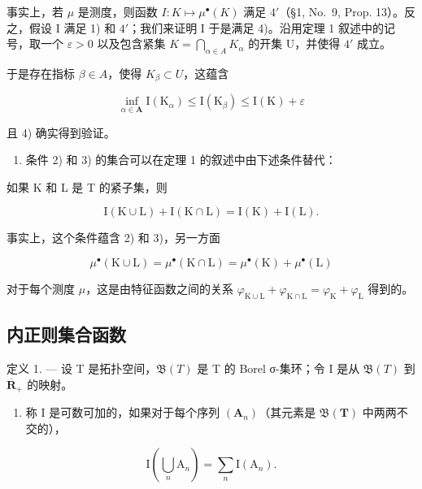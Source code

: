 事实上，若 \(\mu\) 是测度，则函数 \(I: K \mapsto \mu^{\bullet}(K)\) 满足 \(4'\)（§1, No.~9, Prop. 13）。反之，假设 I 满足 1) 和 \(4'\)；我们来证明 I 于是满足 4)。沿用定理 1 叙述中的记号，取一个 \(\varepsilon > 0\) 以及包含紧集 \(K = \bigcap_{\alpha \in A} K_{\alpha}\) 的开集 U，并使得 \(4'\) 成立。

于是存在指标 \(\beta \in A\)，使得 \(K_{\beta} \subset U\)，这蕴含

\[
\inf _ {\alpha \in \mathbf {A}} \mathrm{I} (\mathrm{K} _ {\alpha}) \leqslant \mathrm{I} (\mathrm{K} _ {\beta}) \leqslant \mathrm{I} (\mathrm{K}) + \varepsilon
\]

且 4) 确实得到验证。

\begin{enumerate}
\def\labelenumi{\arabic{enumi})}
\setcounter{enumi}{1}
\tightlist
\item
  条件 2) 和 3) 的集合可以在定理 1 的叙述中由下述条件替代：
\end{enumerate}

如果 K 和 L 是 T 的紧子集，则

\[
\mathrm{I} (\mathrm{K} \cup \mathrm{L}) + \mathrm{I} (\mathrm{K} \cap \mathrm{L}) = \mathrm{I} (\mathrm{K}) + \mathrm{I} (\mathrm{L}).
\]

事实上，这个条件蕴含 2) 和 3)，另一方面

\[
\mu^ {\bullet} (\mathrm{K} \cup \mathrm{L}) = \mu^ {\bullet} (\mathrm{K} \cap \mathrm{L}) = \mu^ {\bullet} (\mathrm{K}) + \mu^ {\bullet} (\mathrm{L})
\]

对于每个测度 \(\mu\)，这是由特征函数之间的关系 \(\varphi_{\mathrm{K}\cup\mathrm{L}} + \varphi_{\mathrm{K}\cap\mathrm{L}} = \varphi_{\mathrm{K}} + \varphi_{\mathrm{L}}\) 得到的。

\subsection{内正则集合函数}

定义 1. --- 设 T 是拓扑空间，\(\mathfrak{B}(T)\) 是 T 的 Borel σ-集环；令 I 是从 \(\mathfrak{B}(T)\) 到 \(\overline{\mathbf{R}}_{+}\) 的映射。

\begin{enumerate}
\def\labelenumi{\alph{enumi})}
\tightlist
\item
  称 I 是可数可加的，如果对于每个序列 \((\mathbf{A}_{n})\)（其元素是 \(\mathfrak{B}(\mathbf{T})\) 中两两不交的），
\end{enumerate}

\[
\mathrm{I} \left(\bigcup_ {n} \mathrm{A} _ {n}\right) = \sum_ {n} \mathrm{I} (\mathrm{A} _ {n}).\tag{4}
\]

